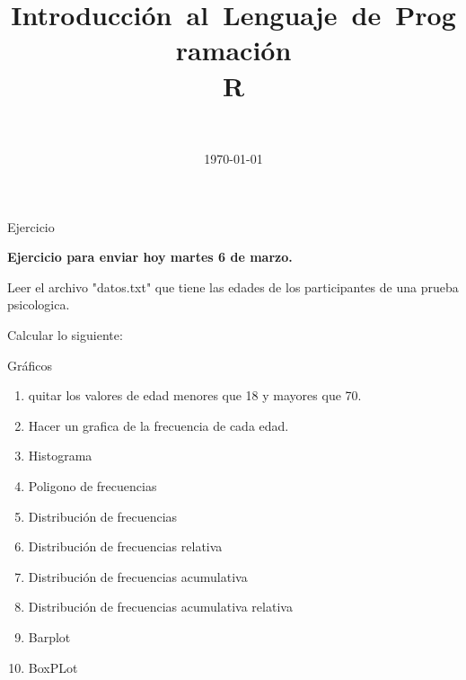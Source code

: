 \documentclass{beamer}
\title[Estad\'istica Descriptiva]
{\mbox{Introducci\'on al Lenguaje de Programaci\'on}\\\mbox{R}}
\author[santosg572@gmail.com]{\nombre \\
{\small \correo}}
\institute[\iniciales]{\instituto}
\date{\today}
\theoremstyle{definition}
\theoremstyle{remark}
\begin{document}






\begin{frame}{Ejercicio}

\textbf{Ejercicio para enviar hoy martes 6 de marzo.}

\vspace{5mm}

Leer el archivo "datos.txt" que tiene las edades de los participantes de una prueba psicologica.

\vspace{5mm}

Calcular lo siguiente:

\end{frame}

\begin{frame}{Gr\'aficos}

\begin{enumerate}
\item quitar los valores de edad menores que 18 y mayores que 70.
\item Hacer un grafica de la frecuencia de cada edad.
\item Histograma
\item Poligono de frecuencias
\item Distribuci\'on de frecuencias
\item Distribuci\'on de frecuencias relativa
\item Distribuci\'on de frecuencias acumulativa
\item Distribuci\'on de frecuencias acumulativa relativa
\item Barplot
\item BoxPLot
\end{enumerate} 


\end{frame}
\end{document}
